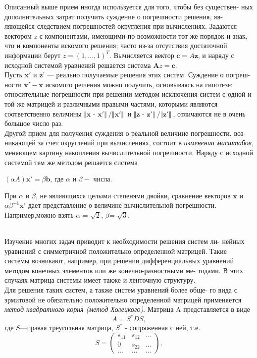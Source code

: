 \documentclass[a4paper, twoside, 12pt]{article}
\begin{document}
\begin{adjustwidth}{1cm}{0cm}

\begin{small}
Описанный выше прием иногда используется для того, чтобы без существен- ных дополнительных затрат получить суждение о погрешности решения, яв- ляющейся следствием погрешностей округления при вычислениях. Задаются вектором $z$ с компонентами, имеющими по возможности тот же порядок и знак, что и компоненты искомого решения; часто из-за отсутствия достаточной информации берут $z = (1, ..., 1)^T.$ 
Вычисляется вектор $\textbf{c} = A\textbf{z}$, и наряду с исходной системой уравнений решается система $\textbf{A}z = \textbf{c}$.
\\ 
Пусть $\textbf{x}'$ и $\textbf{z'}$ — реально получаемые решения этих систем. Суждение о погреш- ности $\textbf{x}' - \textbf{x}$ искомого решения можно получить, основываясь на гипотезе: относительные погрешности при решении методом исключения систем с одной и той же матрицей и различными правыми частями, которыми являются соответственно величины $ \Vert \textbf{x - x}' \Vert \ /  \Vert \textbf{x}' \Vert \ $ и $ \Vert \textbf{z - z}' \Vert \ /  \Vert \textbf{z}' \Vert \ $, отличаются не в очень большое число раз.\\

Другой прием для получения суждения о реальной величине погрешности, воз- никающей за счет округлений при вычислениях, состоит в \textit{изменении масштабов}, меняющем картину накопления вычислительной погрешности. Наряду с
исходной системой тем же методом решается система \\

\begin{center}
 $(\alpha A)\textbf{x}' = \beta \textbf{b} $, где $\alpha$ и $\beta - $ числа.
\end{center}
 При $\alpha$ и $\beta$, не являющихся целыми степенями двойки, сравнение векторов $\textbf{x}$ и
 $\alpha \beta^{-1} \textbf{x}'$ дает представление о величине вычислительной погрешности. Например,можно взять $\alpha$ = $\sqrt{2}$, $\beta$= $\sqrt{3}$.
\end{small}

\end{adjustwidth} 
\\ 
\indent Изучение многих задач приводит к необходимости решения систем ли- нейных уравнений с симметричной положительно определенной матрицей. Такие системы возникают, например, при решении дифференциальных уравнений методом конечных элементов или же конечно-разностными ме- тодами. В этих случаях матрица системы имеет также и ленточную структуру. \\ 
\indent Для решения таких систем, а также систем уравнений более обще- го вида с эрмитовой не обязательно положительно определенной матрицей применяется \textit{метод квадратного корня (метод Холецкого)}. Матрица A представляется в виде
\[A = S^*DS,\]
где $S$—правая треугольная матрица, $S^*$ - сопряженная с ней, т.е.
\[ S = 
\left(
\begin{array}{ccc}
s_{11} & s_{12}& ... \\
0 & s_{22} & ... \\
...& ... & ...
\end{array}
\right) , 
\]
\end{document}
